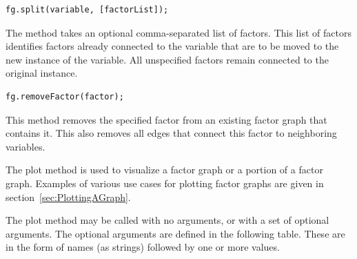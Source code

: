 \begin{lstlisting}
fg.split(variable, [factorList]);
\end{lstlisting}

The method takes an optional comma-separated list of factors.  This list of factors identifies factors already connected to the variable that are to be moved to the new instance of the variable.  All unspecified factors remain connected to the original instance.


\begin{lstlisting}
fg.removeFactor(factor);
\end{lstlisting}

This method removes the specified factor from an existing factor graph that contains it.  This also removes all edges that connect this factor to neighboring variables.

\ifmatlab
{}

The plot method is used to visualize a factor graph or a portion of a factor graph.  Examples of various use cases for plotting factor graphs are given in section~\ref{sec:PlottingAGraph}.

The plot method may be called with no arguments, or with a set of optional arguments.  The optional arguments are defined in the following table.  These are in the form of names (as strings) followed by one or more values.

